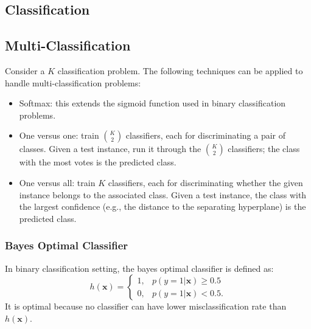         
    
\subsection{Classification}
        \subsection{Multi-Classification}
            Consider a $K$ classification problem.
            The following techniques can be applied to handle multi-classification problems:
            \begin{itemize}
                \item Softmax: this extends the sigmoid function used in binary classification problems.
                \item One versus one: train  $\binom{K}{2}$ classifiers, each for discriminating a pair of classes.
                Given a test instance, run it through the $\binom{K}{2}$ classifiers; the class with the most votes is the predicted class.
                \item One versus all: train $K$ classifiers, each for discriminating whether the given instance belongs to the associated class.
                Given a test instance, the class with the largest confidence (e.g., the distance to the separating hyperplane) is the predicted class.
            \end{itemize}
            
        \subsubsection{Bayes Optimal Classifier}
            In binary classification setting, the bayes optimal classifier is defined as:
                \begin{equation}
                    h(\bm{x}) = \begin{cases} 1, & p(y=1 | \bm{x}) \ge 0.5 \\
                                              0, & p(y=1 | \bm{x}) < 0.5.
                    \end{cases}
                \end{equation}      
            It is optimal because no classifier can have lower misclassification rate than $h(\bm{x})$.
